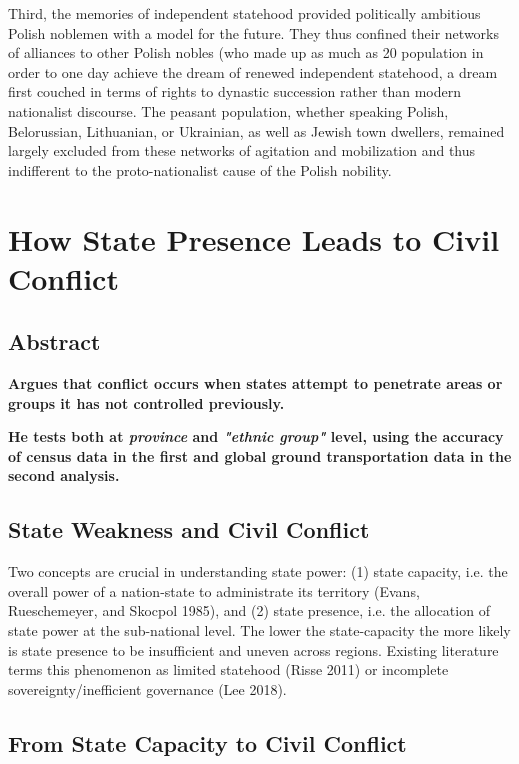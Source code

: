 \documentclass[12pt]{article}
\begin{document}
Third, the memories of independent statehood provided politically ambitious
Polish noblemen with a model for the future.  They thus confined their networks
of alliances to other Polish nobles (who made up as much as 20%
population in order to one day achieve the dream of renewed independent
statehood, a dream first couched in terms of rights to dynastic succession
rather than modern nationalist discourse.  The peasant population, whether
speaking Polish, Belorussian, Lithuanian, or Ukrainian, as well as Jewish town
dwellers, remained largely excluded from these networks of agitation and
mobilization and thus indifferent to the proto-nationalist cause of the Polish
nobility.

\section{How State Presence Leads to Civil Conflict \citep{Ying_2020}}

\subsection{Abstract}

\textbf{Argues that conflict occurs when states attempt to penetrate areas or 
	groups it has not controlled previously.}

\textbf{He tests both at \textit{province} and \textit{"ethnic group"}
level, using the accuracy of census data in the first and global ground
transportation data in the second analysis.}

\subsection{State Weakness and Civil Conflict}

Two concepts are crucial in understanding state power: (1) state capacity, i.e.
the overall power of a nation-state to administrate its territory (Evans,
Rueschemeyer, and Skocpol 1985), and (2) state presence, i.e. the allocation of
state power at the sub-national level. The lower the state-capacity the more
likely is state presence to be insufficient and uneven across regions. Existing
literature terms this phenomenon as limited statehood (Risse 2011) or
incomplete sovereignty/inefficient governance (Lee 2018).

\subsection{From State Capacity to Civil Conflict}
\end{document}
